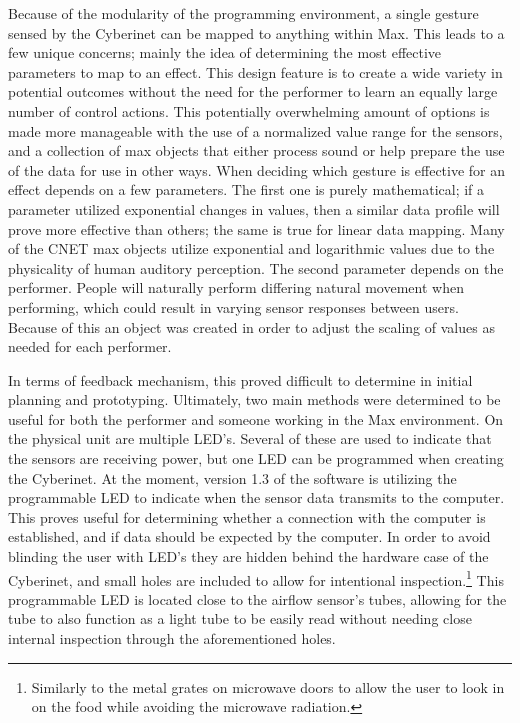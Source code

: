 Because of the modularity of the programming environment, a single gesture sensed by the Cyberinet can be mapped to anything within Max. This leads to a few unique concerns; mainly the idea of determining the most effective parameters to map to an effect. This design feature is to create a wide variety in potential outcomes without the need for the performer to learn an equally large number of control actions. This potentially overwhelming amount of options is made more manageable with the use of a normalized value range for the sensors, and a collection of max objects that either process sound or help prepare the use of the data for use in other ways. When deciding which gesture is effective for an effect depends on a few parameters. The first one is purely mathematical; if a parameter utilized exponential changes in values, then a similar data profile will prove more effective than others; the same is true for linear data mapping. Many of the CNET max objects utilize exponential and logarithmic values due to the physicality of human auditory perception. The second parameter depends on the performer. People will naturally perform differing natural movement when performing\cite{wanderleyClarinetGesture2005}, which could result in varying sensor responses between users. Because of this an object was created in order to adjust the scaling of values as needed for each performer.

In terms of feedback mechanism, this proved difficult to determine in initial planning and prototyping. Ultimately, two main methods were determined to be useful for both the performer and someone working in the Max environment. On the physical unit are multiple LED's. Several of these are used to indicate that the sensors are receiving power, but one LED can be programmed when creating the Cyberinet. At the moment, version 1.3 of the software is utilizing the programmable LED to indicate when the sensor data transmits to the computer. This proves useful for determining whether a connection with the computer is established, and if data should be expected by the computer. In order to avoid blinding the user with LED's they are hidden behind the hardware case of the Cyberinet, and small holes are included to allow for intentional inspection.\footnote{Similarly to the metal grates on microwave doors to allow the user to look in on the food while avoiding the microwave radiation.} This programmable LED is located close to the airflow sensor's tubes, allowing for the tube to also function as a light tube to be easily read without needing close internal inspection through the aforementioned holes.

